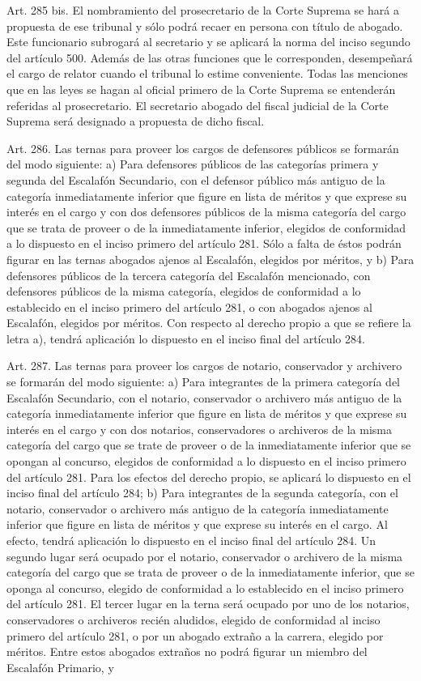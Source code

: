     Art. 285 bis. El nombramiento del prosecretario de la Corte Suprema se hará a propuesta de ese tribunal y sólo podrá recaer en persona con título de abogado.
    Este funcionario subrogará al secretario y se aplicará la norma del inciso segundo del artículo 500.
    Además de las otras funciones que le corresponden, desempeñará el cargo de relator cuando el tribunal lo estime conveniente.
    Todas las menciones que en las leyes se hagan al oficial primero de la Corte Suprema se entenderán referidas al prosecretario.
    El secretario abogado del fiscal judicial de la Corte Suprema será designado a propuesta de dicho fiscal.


    Art. 286. Las ternas para proveer los cargos de defensores públicos se formarán del modo siguiente:
    a) Para defensores públicos de las categorías primera y segunda del Escalafón Secundario, con el defensor público más antiguo de la categoría inmediatamente inferior que figure en lista de méritos y que exprese su interés en el cargo y con dos defensores públicos de la misma categoría del cargo que se trata de proveer o de la inmediatamente inferior, elegidos de conformidad a lo dispuesto en el inciso primero del artículo 281. Sólo a falta de éstos podrán figurar en las ternas abogados ajenos al Escalafón, elegidos por méritos, y
    b) Para defensores públicos de la tercera categoría del Escalafón mencionado, con defensores públicos de la misma categoría, elegidos de conformidad a lo establecido en el inciso primero del artículo 281, o con abogados ajenos al Escalafón, elegidos por méritos.
    Con respecto al derecho propio a que se refiere la letra a), tendrá aplicación lo dispuesto en el inciso final del artículo 284.


    Art. 287. Las ternas para proveer los cargos de notario, conservador y archivero se formarán del modo siguiente:
    a) Para integrantes de la primera categoría del Escalafón Secundario, con el notario, conservador o archivero más antiguo de la categoría inmediatamente inferior que figure en lista de méritos y que exprese su interés en el cargo y con dos notarios, conservadores o archiveros de la misma categoría del cargo que se trate de proveer o de la inmediatamente inferior que se opongan al concurso, elegidos de conformidad a lo dispuesto en el inciso primero del artículo 281.
    Para los efectos del derecho propio, se aplicará lo dispuesto en el inciso final del artículo 284;
    b) Para integrantes de la segunda categoría, con el notario, conservador o archivero más antiguo de la categoría inmediatamente inferior que figure en lista de méritos y que exprese su interés en el cargo. Al efecto, tendrá aplicación lo dispuesto en el inciso final del artículo 284. Un segundo lugar será ocupado por el notario, conservador o archivero de la misma categoría del cargo que se trata de proveer o de la inmediatamente inferior, que se oponga al concurso, elegido de conformidad a lo establecido en el inciso primero del artículo 281. El tercer lugar en la terna será ocupado por uno de los notarios, conservadores o archiveros recién aludidos, elegido de conformidad al inciso primero del artículo 281, o por un abogado extraño a la carrera, elegido por méritos. Entre estos abogados extraños no podrá figurar un miembro del Escalafón Primario, y

